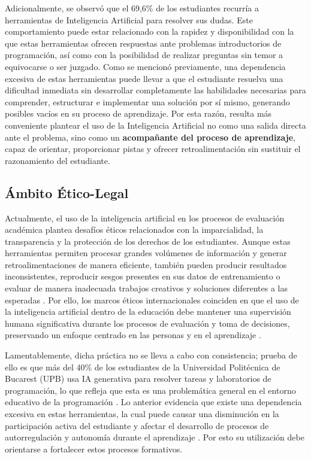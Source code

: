 \documentclass[letterpaper, 10 pt, conference]{ieeeconf}
\begin{document}
Adicionalmente, se observó que el 69,6\% de los estudiantes recurría a herramientas de Inteligencia Artificial para resolver sus dudas. Este comportamiento puede estar relacionado con la rapidez y disponibilidad con la que estas herramientas ofrecen respuestas ante problemas introductorios de programación, así como con la posibilidad de realizar preguntas sin temor a equivocarse o ser juzgado. Como se mencionó previamente, una dependencia excesiva de estas herramientas puede llevar a que el estudiante resuelva una dificultad inmediata sin desarrollar completamente las habilidades necesarias para comprender, estructurar e implementar una solución por sí mismo, generando posibles vacíos en su proceso de aprendizaje. Por esta razón, resulta más conveniente plantear el uso de la Inteligencia Artificial no como una salida directa ante el problema, sino como un \textbf{acompañante del proceso de aprendizaje}, capaz de orientar, proporcionar pistas y ofrecer retroalimentación sin sustituir el razonamiento del estudiante.


\subsection{Ámbito Ético-Legal}  


Actualmente, el uso de la inteligencia artificial en los procesos de evaluación académica plantea desafíos éticos relacionados con la imparcialidad, la transparencia y la protección de los derechos de los estudiantes. Aunque estas herramientas permiten procesar grandes volúmenes de información y generar retroalimentaciones de manera eficiente, también pueden producir resultados inconsistentes, reproducir sesgos presentes en sus datos de entrenamiento o evaluar de manera inadecuada trabajos creativos y soluciones diferentes a las esperadas \cite{8}. Por ello, los marcos éticos internacionales coinciden en que el uso de la inteligencia artificial dentro de la educación debe mantener una supervisión humana significativa durante los procesos de evaluación y toma de decisiones, preservando un enfoque centrado en las personas y en el aprendizaje \cite{4}.

Lamentablemente, dicha práctica no se lleva a cabo con consistencia; prueba de ello es que más del 40\% de los estudiantes de la Universidad Politécnica de Bucarest (UPB) usa IA generativa para resolver tareas y laboratorios de programación, lo que refleja que esta es una problemática general en el entorno educativo de la programación \cite{22}. Lo anterior evidencia que existe una dependencia excesiva en estas herramientas, la cual puede causar una disminución en la participación activa del estudiante y afectar el desarrollo de procesos de autorregulación y autonomía durante el aprendizaje \cite{4}. Por esto su utilización debe orientarse a fortalecer estos procesos formativos.
\end{document}
